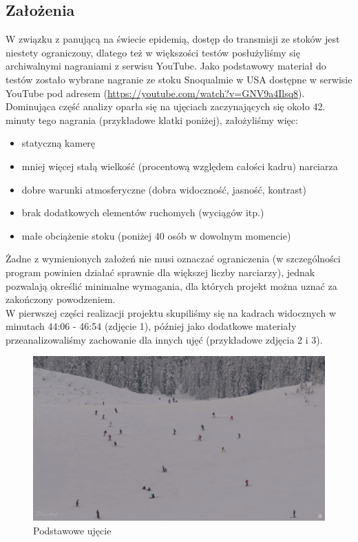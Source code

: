 \documentclass[a4paper]{article}
\begin{document}
\subsection{Założenia}
W związku z panującą na świecie epidemią, dostęp do transmisji ze stoków jest niestety ograniczony, dlatego też w większości testów posłużyliśmy się archiwalnymi nagraniami z serwisu YouTube. Jako podstawowy materiał do testów zostało wybrane nagranie ze stoku Snoqualmie w USA dostępne w serwisie YouTube pod adresem (\url{https://youtube.com/watch?v=GNV9a4Ilsq8}).\\ 
Dominująca część analizy oparła się na ujęciach zaczynających się około 42. minuty tego nagrania (przykładowe klatki poniżej), założyliśmy więc:
\begin{itemize}
\item statyczną kamerę
\item mniej więcej stałą wielkość (procentową względem całości kadru) narciarza
\item dobre warunki atmosferyczne (dobra widoczność, jasność, kontrast)
\item brak dodatkowych elementów ruchomych (wyciągów itp.)
\item małe obciążenie stoku (poniżej 40 osób w dowolnym momencie)
\end{itemize}
Żadne z wymienionych założeń nie musi oznaczać ograniczenia (w szczególności program powinien działać sprawnie dla większej liczby narciarzy), jednak pozwalają określić minimalne wymagania, dla których projekt można uznać za zakończony powodzeniem.\\
W pierwszej części realizacji projektu skupiliśmy się na kadrach widocznych w minutach 44:06 - 46:54 (zdjęcie 1), później jako dodatkowe materiały przeanalizowaliśmy zachowanie dla innych ujęć (przykładowe zdjęcia 2 i 3).
\begin{figure}[H]
  \includegraphics[width=\linewidth]{resources/img1.png}
  \caption{Podstawowe ujęcie}
\end{figure}
\end{document}

